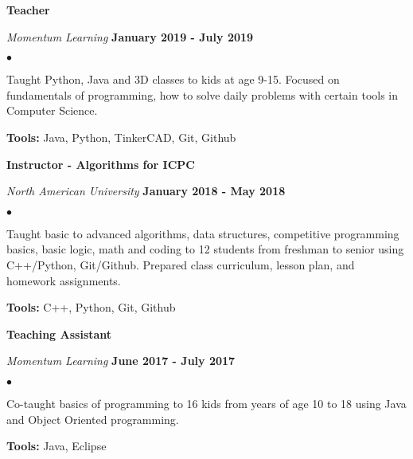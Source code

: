 \documentclass[margin,line]{res}
\newenvironment{list2}{
  \begin{list}{$\bullet$}{%
      \setlength{\itemsep}{0in}
      \setlength{\parsep}{0in} \setlength{\parskip}{0in}
      \setlength{\topsep}{0in} \setlength{\partopsep}{0in} 
      \setlength{\leftmargin}{0.2in}}}{\end{list}}
\begin{document}
\begin{resume}
{\bf Teacher}

\vspace{-.3cm}
{\em Momentum Learning} \hfill {\bf January 2019 - July 2019}\\
\begin{list2}
\item Taught Python, Java and 3D classes to kids at age 9-15. Focused on fundamentals of programming, how to solve daily problems with certain tools in Computer Science.
\item \textbf{Tools:} Java, Python, TinkerCAD, Git, Github
\end{list2}
\vspace*{.05in}

{\bf Instructor - Algorithms for ICPC}

\vspace{-.3cm}
{\em North American University} \hfill {\bf January 2018 - May 2018}\\
\begin{list2}
\item Taught basic to advanced algorithms, data structures, competitive programming basics, basic logic, math and coding to 12 students from freshman to senior using C++/Python, Git/Github. Prepared class curriculum, lesson plan, and homework assignments.
\item \textbf{Tools:} C++, Python, Git, Github
\end{list2}
\vspace*{.05in}

{\bf Teaching Assistant}

\vspace{-.3cm}
{\em Momentum Learning} \hfill {\bf June 2017 - July 2017}\\
\begin{list2}
\item Co-taught basics of programming to 16 kids from years of age 10 to 18 using Java and Object Oriented programming.
\item \textbf{Tools:} Java, Eclipse
\end{list2}
\vspace*{.05in}



\end{resume}
\end{document}

